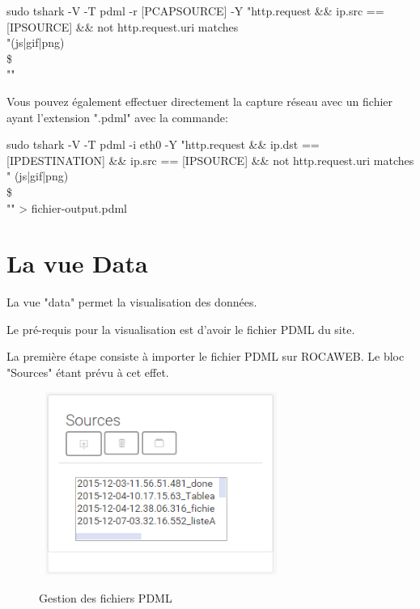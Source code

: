 \documentclass[a4paper,10pt,justified,openany]{tufte-book}
\begin{document}
\begin{large}
sudo tshark -V -T pdml -r [PCAPSOURCE] -Y "http.request \&\& ip.src == [IPSOURCE] \&\& not http.request.uri matches \\ "(js|gif|png)\\\$\\ ""
\end{large}
 
\smallbreak
Vous pouvez également effectuer directement la capture réseau avec un fichier ayant l'extension ".pdml" avec la commande:  
 

\begin{large}
sudo tshark -V -T pdml -i eth0 -Y "http.request \&\& ip.dst == [IPDESTINATION] \&\& ip.src == [IPSOURCE] \&\& not http.request.uri matches \\ " (js|gif|png)\\ \$\\ "" > fichier-output.pdml

\end{large}











\chapter{La vue Data}
La vue "data" permet la visualisation des données. 

Le pré-requis pour la visualisation est d'avoir le fichier PDML du site.

La première étape consiste à importer le fichier PDML sur ROCAWEB. Le bloc "Sources" étant prévu à cet effet.

\begin{figure}
\includegraphics[width=8cm, height=6cm]{./images/blocdatasource.png}
\label{vueapprentissage}
\caption{Gestion des fichiers PDML}
\end{figure}
\end{document}
